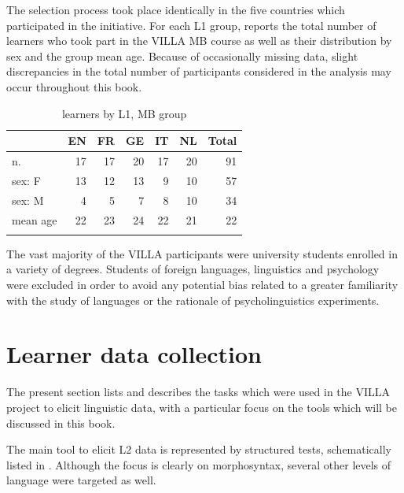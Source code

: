 The selection process took place identically in the five countries which participated in the initiative. For each L1 group,  reports the total number of learners who took part in the VILLA MB course as well as their distribution by sex and the group mean age. Because of occasionally missing data, slight discrepancies in the total number of participants considered in the analysis may occur throughout this book.

\begin{table}
    \begin{tabularx}{.66\textwidth}{Xrrrrrr}
    \lsptoprule
         & EN & FR & GE & IT & NL & Total\\
    \midrule
        n. & 17 & 17 & 20 & 17 & 20 & 91\\
        sex: F & 13 & 12 & 13 & 9 & 10 & 57\\
        sex: M & 4 & 5 & 7 & 8 & 10 & 34\\
        mean age & 22 & 23 & 24 & 22 & 21 & 22\\
    \lspbottomrule
    \end{tabularx}
    \caption{learners by L1, MB group}
    \label{tab:02:8}
\end{table}

The vast majority of the VILLA participants were university students enrolled in a variety of degrees. Students of foreign languages, linguistics and psychology were excluded in order to avoid any potential bias related to a greater familiarity with the study of languages or the rationale of psycholinguistics experiments.

\section{Learner data collection}\label{sec:02:4}
\largerpage
The present section lists and describes the tasks which were used in the VILLA project to elicit linguistic data, with a particular focus on the tools which will be discussed in this book.

The main tool to elicit L2 data is represented by structured tests, schematically listed in . Although the focus is clearly on morphosyntax, several other levels of language were targeted as well.

